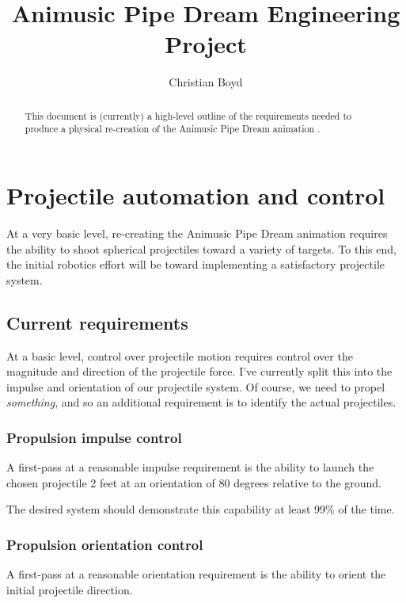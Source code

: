 \documentclass{article}
\begin{document}
\title{Animusic Pipe Dream Engineering Project}

\author{Christian Boyd}

\maketitle

\tableofcontents

\begin{abstract}
    This document is (currently) a high-level outline of the requirements needed to 
    produce a physical re-creation of the Animusic Pipe Dream animation \cite{AnimusicPipeDream}.
\end{abstract}

\section{Projectile automation and control}
At a very basic level, re-creating the Animusic Pipe Dream animation requires the ability
to shoot spherical projectiles toward a variety of targets.  To this end, the initial
robotics effort will be toward implementing a satisfactory projectile system.

\subsection{Current requirements}

At a basic level, control over projectile motion requires control over the magnitude and
direction of the projectile force.  I've currently split this into the impulse and
orientation of our projectile system.  Of course, we need to propel {\it something}, and
so an additional requirement is to identify the actual projectiles.

\subsubsection{Propulsion impulse control}
A first-pass at a reasonable impulse requirement is the ability to launch the chosen
projectile 2 feet at an orientation of 80 degrees relative to the ground.

The desired system should demonstrate this capability at least 99\% of the time.

\subsubsection{Propulsion orientation control}
A first-pass at a reasonable orientation requirement is the ability to orient the initial
projectile direction.
\end{document}
